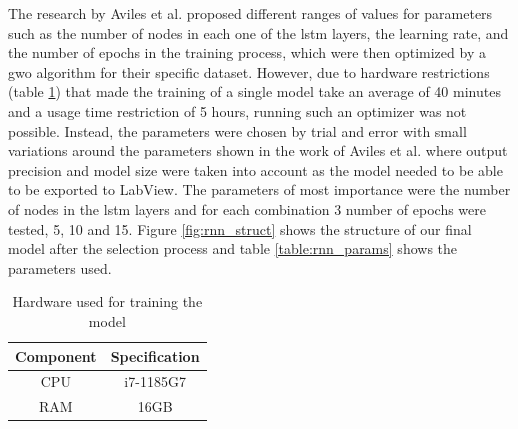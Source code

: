 The research by Aviles et al. \cite{RNNEMG} proposed different ranges of values for parameters such as the number of nodes in each one of the \acrshort{lstm} 
layers, the learning rate, and the number of epochs in the training process, which were then optimized by a \acrfull{gwo} 
algorithm for their specific dataset. However, due to hardware restrictions (table \ref{table:hardware}) that made the training of a 
single model take an average of 40 minutes and a usage time restriction of 5 hours, running such an optimizer was not possible. Instead, 
the parameters were chosen by trial and error with small variations around the parameters shown in the work of Aviles et al. \cite{RNNEMG} where output precision and 
model size were taken into account as the model needed to be able to be exported to LabView.
The parameters of most importance were the number of nodes in the \acrshort{lstm} layers and for each combination 3 number of epochs were
tested, 5, 10 and 15.
Figure \ref{fig:rnn_struct} shows the structure of our final model after the selection process and table \ref{table:rnn_params} shows the parameters used.

\begin{table}[h]
    \centering
    \caption{Hardware used for training the model}
    \label{table:hardware}
    \begin{tabular}{|c|c|}
        \hline
        \textbf{Component} & \textbf{Specification} \\ \hline
        CPU & i7-1185G7 \\ \hline
        RAM & 16GB \\ \hline
    \end{tabular}
\end{table}

